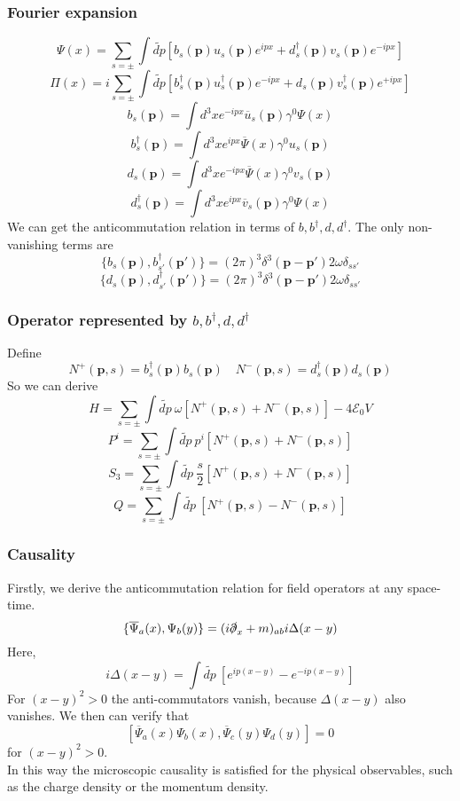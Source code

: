 \subsubsection{Fourier expansion}
\[\Psi(x) = \sum_{s = \pm} \int \widetilde{dp} \left[ b_s(\bm{p})u_s(\bm{p}) e^{ipx} + d^{\dagger}_s(\bm{p})v_s(\bm{p}) e^{-ipx}\right]\]
\[\Pi(x) = i\sum_{s = \pm} \int \widetilde{dp} \left[ b^{\dagger}_s(\bm{p})u^{\dagger}_s(\bm{p}) e^{-ipx} + d_s(\bm{p})v^{\dagger}_s(\bm{p}) e^{+ipx}\right]\]
\[b_s(\bm{p}) = \int d^3x e^{-ipx} \overline{u}_s(\bm{p}) \gamma^0 \Psi(x)\]
\[b^{\dagger}_s(\bm{p}) = \int d^3x e^{ipx} \overline{\Psi}(x) \gamma^0 u_s(\bm{p})\]
\[d_s(\bm{p}) = \int d^3x e^{-ipx} \overline{\Psi}(x) \gamma^0 v_s(\bm{p})\]
\[d^{\dagger}_s(\bm{p}) = \int d^3x e^{ipx} \overline{v}_s(\bm{p}) \gamma^0 \Psi(x)\]
We can get the anticommutation relation in terms of $b,b^{\dagger},d,d^{\dagger}$. The only non-vanishing terms are
\[\{b_s(\bm{p}),b^{\dagger}_{s'}(\bm{p}')\} = (2\pi)^3 \delta^3(\bm{p}-\bm{p}')2\omega \delta_{ss'}\]
\[\{d_s(\bm{p}),d^{\dagger}_{s'}(\bm{p}')\} = (2\pi)^3 \delta^3(\bm{p}-\bm{p}')2\omega \delta_{ss'}\]

\subsubsection{Operator represented by $b,b^{\dagger},d,d^{\dagger}$}
\noindent
Define
\[N^{+}(\bm{p},s) = b^{\dagger}_s(\bm{p}) b_s(\bm{p}) \quad N^{-}(\bm{p},s) = d^{\dagger}_s(\bm{p}) d_s(\bm{p})\]
So we can derive
\[ H = \sum_{s=\pm} \int \widetilde{dp} \: \omega \left[ N^{+}(\bm{p},s) + N^{-}(\bm{p},s)\right] - 4\mathcal{E}_0V\]
\[ P^i = \sum_{s=\pm} \int \widetilde{dp} \: p^i \left[ N^{+}(\bm{p},s) + N^{-}(\bm{p},s)\right] \]
\[S_3 = \sum_{s=\pm} \int \widetilde{dp} \: \frac{s}{2} \left[ N^{+}(\bm{p},s) + N^{-}(\bm{p},s)\right]\]
\[Q = \sum_{s=\pm} \int \widetilde{dp} \: \left[ N^{+}(\bm{p},s) - N^{-}(\bm{p},s)\right]\]

\subsubsection{Causality}
\noindent
Firstly, we derive the anticommutation relation for field operators at any space-time.
\[\{\overline{\Psi}_{a}(x),\Psi_{b}(y)\} = (i\slashed{\partial}_x + m)_{ab} i\Delta(x-y)\]
Here,
\[i\Delta(x-y) = \int \widetilde{dp} \: [e^{ip(x-y)} - e^{-ip(x-y)}]\]
For $(x-y)^2 > 0$ the anti-commutators vanish, because $\Delta(x-y)$ also vanishes. 
We then can verify that
\[[\overline{\Psi}_{a}(x)\Psi_{b}(x),\overline{\Psi}_{c}(y)\Psi_{d}(y)] = 0\]
for $(x-y)^2 > 0$.\\
In this way the microscopic causality is satisfied for the physical observables, such as the charge density or the momentum density.

